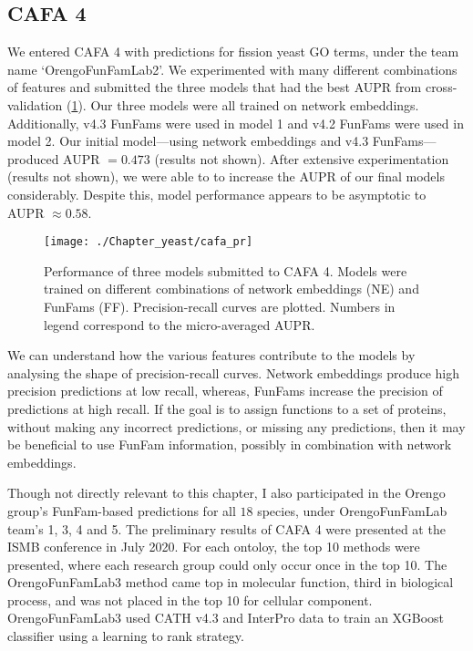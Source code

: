 \subsection{CAFA 4}

We entered CAFA 4 with predictions for fission yeast GO terms, under the team name `OrengoFunFamLab2'. We experimented with many different combinations of features and submitted the three models that had the best AUPR from cross-validation (\ref{fig:cafa-pr}). Our three models were all trained on network embeddings. Additionally, v4.3 FunFams were used in model 1 and v4.2 FunFams were used in model 2. Our initial model---using network embeddings and v4.3 FunFams---produced AUPR $= 0.473$ (results not shown). After extensive experimentation (results not shown), we were able to to increase the AUPR of our final models considerably. Despite this, model performance appears to be asymptotic to AUPR $\approx 0.58$.

\begin{figure}[!hbt]
    \centering
    \texttt{[image: ./Chapter\_yeast/cafa\_pr]}
    \caption{%
        Performance of three models submitted to CAFA 4.
        Models were trained on different combinations of network embeddings (NE) and FunFams (FF).
        Precision-recall curves are plotted.
        Numbers in legend correspond to the micro-averaged AUPR.
    }
    \label{fig:cafa-pr}
\end{figure}

We can understand how the various features contribute to the models by analysing the shape of precision-recall curves. Network embeddings produce high precision predictions at low recall, whereas, FunFams increase the precision of predictions at high recall. If the goal is to assign functions to a set of proteins, without making any incorrect predictions, or missing any predictions, then it may be beneficial to use FunFam information, possibly in combination with network embeddings.

Though not directly relevant to this chapter, I also participated in the Orengo group's FunFam-based predictions for all $18$ species, under OrengoFunFamLab team's 1, 3, 4 and 5. The preliminary results of CAFA 4 were presented at the ISMB conference in July 2020. For each ontoloy, the top 10 methods were presented, where each research group could only occur once in the top 10. The OrengoFunFamLab3 method came top in molecular function, third in biological process, and was not placed in the top 10 for cellular component. OrengoFunFamLab3 used CATH v4.3 and InterPro data to train an XGBoost classifier using a learning to rank strategy.


